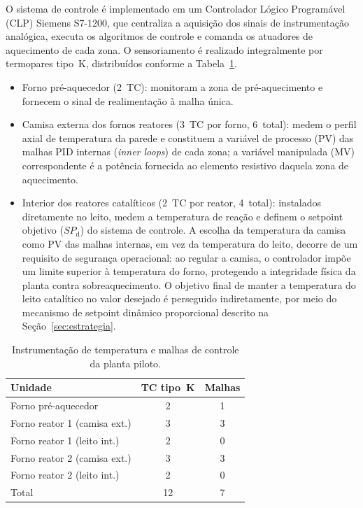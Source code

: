 O sistema de controle é implementado em um Controlador Lógico Programável (CLP)
Siemens S7-1200, que centraliza a aquisição dos sinais de instrumentação
analógica, executa os algoritmos de controle e comanda os atuadores de
aquecimento de cada zona.\citep{luyben2014} O sensoriamento é realizado
integralmente por termopares tipo~K, distribuídos conforme a
Tabela~\ref{tab:instrumentacao}.

\begin{itemize}
  \item Forno pré-aquecedor (2~TC): monitoram a zona de pré-aquecimento e
    fornecem o sinal de realimentação à malha única.
  \item Camisa externa dos fornos reatores (3~TC por forno, 6~total):
    medem o perfil axial de temperatura da parede e constituem a variável de
    processo (PV) das malhas PID internas (\emph{inner loops}) de cada zona;
    a variável manipulada (MV) correspondente é a potência fornecida ao
    elemento resistivo daquela zona de aquecimento.
  \item Interior dos reatores catalíticos (2~TC por reator, 4~total):
    instalados diretamente no leito, medem a temperatura de reação e definem
    o setpoint objetivo ($SP_{\mathrm{d}}$) do sistema de controle. A escolha
    da temperatura da camisa como PV das malhas internas, em vez da temperatura
    do leito, decorre de um requisito de segurança operacional: ao regular a
    camisa, o controlador impõe um limite superior à temperatura do forno,
    protegendo a integridade física da planta contra sobreaquecimento. O
    objetivo final de manter a temperatura do leito catalítico no valor
    desejado é perseguido indiretamente, por meio do mecanismo de setpoint
    dinâmico proporcional descrito na Seção~\ref{sec:estrategia}.
\end{itemize}

\begin{table}[ht]
\begin{center}
\caption{Instrumentação de temperatura e malhas de controle da planta piloto.}
\label{tab:instrumentacao}
\begin{tabular}{lcc}
\hline
Unidade & TC tipo~K & Malhas \\
\hline
Forno pré-aquecedor              & 2 & 1 \\
Forno reator 1 (camisa ext.)     & 3 & 3 \\
Forno reator 1 (leito int.)      & 2 & 0 \\
Forno reator 2 (camisa ext.)     & 3 & 3 \\
Forno reator 2 (leito int.)      & 2 & 0 \\
\hline
Total & 12 & 7 \\
\hline
\end{tabular}
\end{center}
\end{table}

